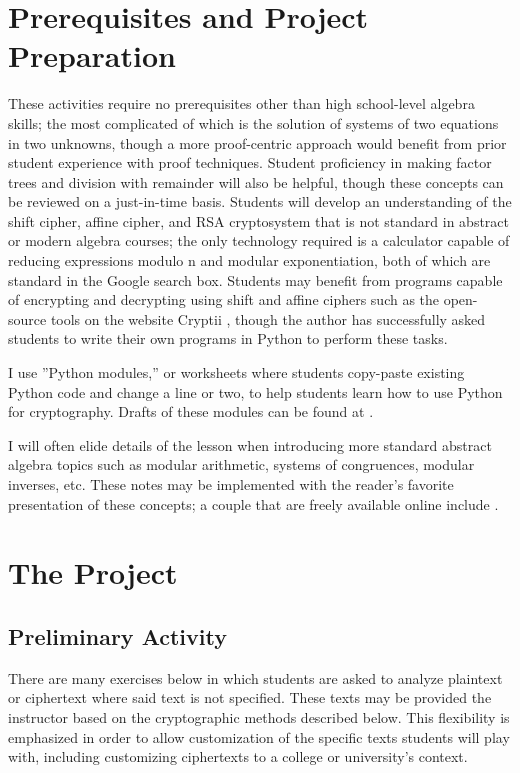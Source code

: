 \documentclass[11pt]{article}
\theoremstyle{plain}
\theoremstyle{remark}
\theoremstyle{definition}
\theoremstyle{definition}
\theoremstyle{definition}
\theoremstyle{plain}
\theoremstyle{plain}
\theoremstyle{plain}
\theoremstyle{definition}
\begin{document}
\section{Prerequisites and Project Preparation}

These activities require no prerequisites other than high school-level
algebra skills; the most complicated of which is the solution of systems
of two equations in two unknowns, though a more proof-centric approach
would benefit from prior student experience with proof techniques.
Student proficiency in making factor trees and division with remainder
will also be helpful, though these concepts can be reviewed on a just-in-time
basis. Students will develop an understanding of the shift cipher,
affine cipher, and RSA cryptosystem that is not standard in abstract
or modern algebra courses; the only technology required is a calculator
capable of reducing expressions modulo n and modular exponentiation,
both of which are standard in the Google search box. Students may
benefit from programs capable of encrypting and decrypting using shift
and affine ciphers such as the open-source tools on the website Cryptii
\cite{friederesCryptii2022}, though the author has successfully asked students
to write their own programs in Python to perform these tasks. 

I use ''Python modules,'' or worksheets where students copy-paste
existing Python code and change a line or two, to help students learn
how to use Python for cryptography. Drafts of these modules can be
found at \cite{inceResourcesFirstYearCollege2022}. 

I will often elide details of the lesson when introducing more standard
abstract algebra topics such as modular arithmetic, systems of congruences,
modular inverses, etc. These notes may be implemented with the reader's
favorite presentation of these concepts; a couple that are freely
available online include \cite{mcdevittClassNotesCryptologic2012,crismanNumberTheoryContext2021}.

\section{The Project}
\subsection{Preliminary Activity}
There are many exercises below in which students are asked to analyze
plaintext or ciphertext where said text is not specified. These texts may be provided the instructor based on the
cryptographic methods described below. This flexibility is emphasized
in order to allow customization of the specific texts students will
play with, including customizing ciphertexts to a college or university's
context.
\end{document}
